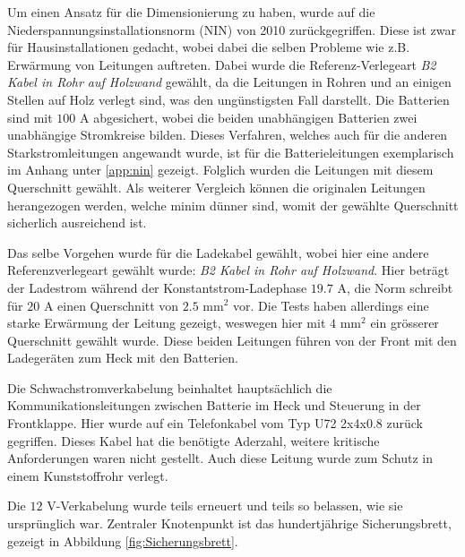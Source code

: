 Um einen Ansatz für die Dimensionierung zu haben, wurde auf die Niederspannungsinstallationsnorm (NIN) von 2010 \cite{NIN} zurückgegriffen. Diese ist zwar für Hausinstallationen gedacht, wobei dabei die selben Probleme wie z.B. Erwärmung von Leitungen auftreten. Dabei wurde die Referenz-Verlegeart \textit{B2 Kabel in Rohr auf Holzwand} gewählt, da die Leitungen in Rohren und an einigen Stellen auf Holz verlegt sind, was den ungünstigsten Fall darstellt. Die Batterien sind mit $100$ A abgesichert, wobei die beiden unabhängigen Batterien zwei unabhängige Stromkreise bilden. Dieses Verfahren, welches auch für die anderen Starkstromleitungen angewandt wurde, ist für die Batterieleitungen exemplarisch im Anhang unter \ref{app:nin} gezeigt. Folglich wurden die Leitungen mit diesem Querschnitt gewählt. Als weiterer Vergleich können die originalen Leitungen herangezogen werden, welche minim dünner sind, womit der gewählte Querschnitt sicherlich ausreichend ist.

Das selbe Vorgehen wurde für die Ladekabel gewählt, wobei hier eine andere Referenzverlegeart gewählt wurde: \textit{B2 Kabel in Rohr auf Holzwand}. Hier beträgt der Ladestrom während der Konstantstrom-Ladephase $19.7$ A, die Norm schreibt für $20$ A einen Querschnitt von $2.5$ mm$^2$ vor. Die Tests haben allerdings eine starke Erwärmung der Leitung gezeigt, weswegen hier mit $4$ mm$^2$ ein grösserer Querschnitt gewählt wurde. Diese beiden Leitungen führen von der Front mit den Ladegeräten zum Heck mit den Batterien.

Die Schwachstromverkabelung beinhaltet hauptsächlich die Kommunikationsleitungen zwischen Batterie im Heck und Steuerung in der Frontklappe. Hier wurde auf ein Telefonkabel vom Typ U72 2x4x0.8 \cite{u72} zurück gegriffen. Dieses Kabel hat die benötigte Aderzahl, weitere kritische Anforderungen waren nicht gestellt. Auch diese Leitung wurde zum Schutz in einem Kunststoffrohr verlegt.

Die $12$ V-Verkabelung wurde teils erneuert und teils so belassen, wie sie ursprünglich war. Zentraler Knotenpunkt ist das hundertjährige Sicherungsbrett, gezeigt in Abbildung \ref{fig:Sicherungsbrett}.


